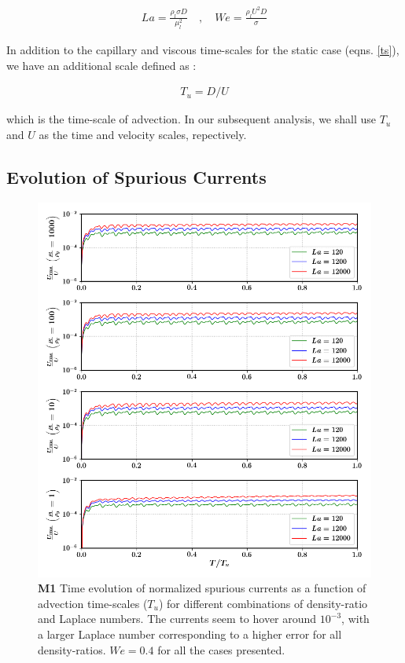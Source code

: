 \begin{align}
        La = \frac{\rho_l \sigma D}{\mu_l^2} \quad , \quad We = \frac{\rho_l U^2 D}{\sigma}
\end{align}

In addition to the capillary and viscous time-scales for the static case (eqns. \ref{ts}), we have an additional scale defined as :

\begin{align}
	T_{u} = D/U
\end{align}

which is the time-scale of advection. In our subsequent analysis, we shall use $T_u$ and $U$ as the time and velocity scales, repectively.

\subsection*{Evolution of Spurious Currents}

\begin{figure}[h!]
    \centering
    \includegraphics[]{plots/droplet_advect/evo_nonmc.png}
	\caption{\textbf{M1} Time evolution of normalized spurious currents as a function of advection time-scales ($T_u$) for different combinations of density-ratio and Laplace numbers. The currents seem to hover around $10^{-3}$, with a larger Laplace number corresponding to a higher error for all density-ratios. $We = 0.4$ for all the cases presented.}   
    \label{evo_nonmc}
\end{figure}

